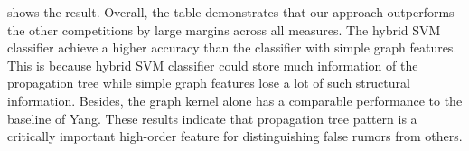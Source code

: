  shows the result.
Overall, the table demonstrates that our approach outperforms
the other competitions by large margins across all measures.
The hybrid SVM classifier achieve a higher accuracy than the classifier with simple graph features. This is because hybrid SVM classifier could store much information of the propagation tree while simple graph features lose a lot of 
such structural information.
Besides, the graph kernel alone has
a comparable performance to the baseline of Yang.
These results indicate that propagation tree pattern is a critically
important high-order feature for distinguishing false rumors from others.

